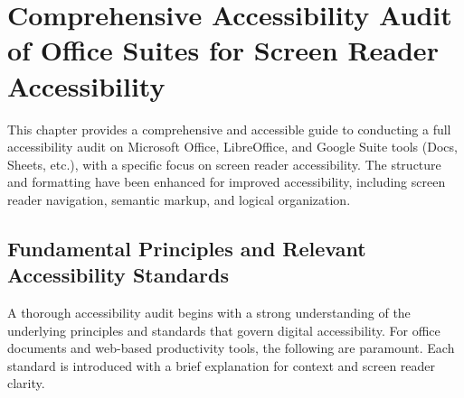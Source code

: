 \chapter{Comprehensive Accessibility Audit of Office Suites for Screen Reader Accessibility}
\label{chap:office-suite-audit}

\begin{raggedright}
This chapter provides a comprehensive and accessible guide to conducting a full accessibility audit on Microsoft Office, LibreOffice, and Google Suite tools (Docs, Sheets, etc.), with a specific focus on screen reader accessibility. The structure and formatting have been enhanced for improved accessibility, including screen reader navigation, semantic markup, and logical organization.
\end{raggedright}

\section{Fundamental Principles and Relevant Accessibility Standards}
\label{sec:office-principles-standards}

A thorough accessibility audit begins with a strong understanding of the underlying principles and standards that govern digital accessibility. For office documents and web-based productivity tools, the following are paramount. Each standard is introduced with a brief explanation for context and screen reader clarity.

